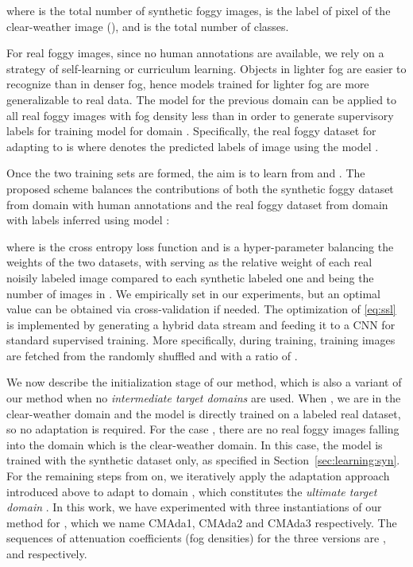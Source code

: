 \documentclass[twocolumn]{svjour3}          \smartqed  \usepackage{graphicx}
\begin{document}
where  is the total number of synthetic foggy images,  is the label of pixel  of the clear-weather image  (), and  is the total number of classes.

For real foggy images, since no human annotations are available, we rely on a strategy of self-learning or curriculum learning. Objects in lighter fog are easier to recognize than in denser fog, hence models trained for lighter fog are more generalizable to real data. The model  for the previous domain  can be applied to all real foggy images with fog density less than  in order to generate supervisory labels for training model  for domain . Specifically, the real foggy dataset for adapting to  is
 where  denotes the predicted labels of image  using the model . 

Once the two training sets are formed, the aim is to learn  from  and . The proposed scheme balances the contributions of both the synthetic foggy dataset  from domain  with human annotations and the real foggy dataset  from domain  with labels inferred using model :

where  is the cross entropy loss function and  is a hyper-parameter balancing the weights of the two datasets, with  serving as the relative weight of each real noisily labeled image compared to each synthetic labeled one and  being the number of images in . We empirically set  in our experiments, but an optimal value can be obtained via cross-validation if needed. The optimization of \eqref{eq:ssl} is implemented by generating a hybrid data stream and feeding it to a CNN for standard supervised training. More specifically, during training, training images are fetched from the randomly shuffled  and  with a ratio  of .   

We now describe the initialization stage of our method, which is also a variant of our method when no \emph{intermediate target domains} are used.
When , we are in the clear-weather domain and the model  is directly trained on a labeled real dataset, so no adaptation is required. For the case , there are no real foggy images falling into the domain  which is the clear-weather domain. In this case, the model  is trained with the synthetic dataset  only, as specified in Section~\ref{sec:learning:syn}. For the remaining steps from  on, we iteratively apply the adaptation approach introduced above to adapt to domain , which constitutes the \emph{ultimate target domain} .
In this work, we have experimented with three instantiations of our method for , which we name CMAda1, CMAda2 and CMAda3 respectively. The sequences of attenuation coefficients (fog densities) for the three versions are ,  and  respectively.
\end{document}
